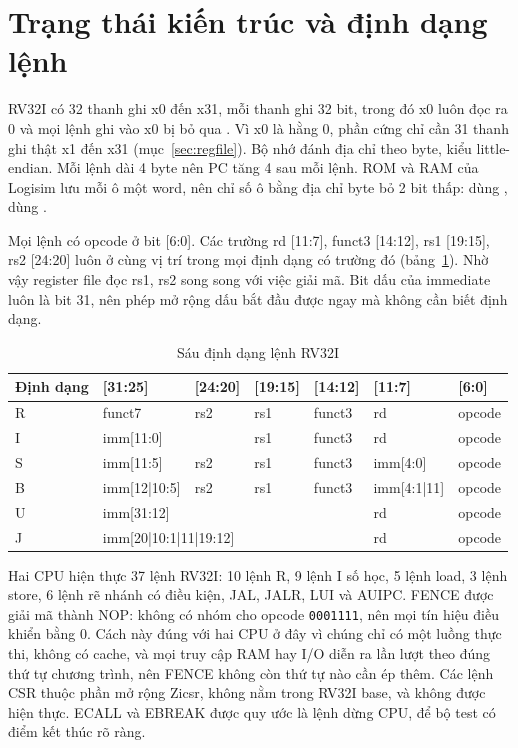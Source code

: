 \documentclass[../report.tex]{subfiles}
\begin{document}
\section{Trạng thái kiến trúc và định dạng lệnh}\label{sec:isa}

RV32I có 32 thanh ghi x0 đến x31, mỗi thanh ghi 32 bit, trong đó x0 luôn đọc ra 0 và mọi lệnh ghi vào x0 bị bỏ
qua \cite{riscv-spec}. Vì x0 là hằng 0, phần cứng chỉ cần 31 thanh ghi thật x1 đến x31
(mục~\ref{sec:regfile}). Bộ nhớ đánh địa chỉ theo byte, kiểu little-endian. Mỗi lệnh dài 4 byte nên PC tăng 4 sau
mỗi lệnh. ROM và RAM của Logisim lưu mỗi ô một word, nên chỉ số ô bằng địa chỉ byte bỏ 2 bit thấp: 
dùng ,  dùng .

Mọi lệnh có opcode ở bit [6:0]. Các trường rd [11:7], funct3 [14:12], rs1 [19:15], rs2 [24:20] luôn ở cùng vị trí
trong mọi định dạng có trường đó (bảng~\ref{tab:fmt}). Nhờ vậy register file đọc rs1, rs2 song song với việc giải
mã. Bit dấu của immediate luôn là bit 31, nên phép mở rộng dấu bắt đầu được ngay mà không cần biết định dạng.

\begin{table}[H]
\centering\small
\caption{Sáu định dạng lệnh RV32I}\label{tab:fmt}
\begin{tabular}{@{}lllllll@{}}
\toprule
Định dạng & [31:25] & [24:20] & [19:15] & [14:12] & [11:7] & [6:0] \\
\midrule
R & funct7 & rs2 & rs1 & funct3 & rd & opcode \\
I & \multicolumn{2}{l}{imm[11:0]} & rs1 & funct3 & rd & opcode \\
S & imm[11:5] & rs2 & rs1 & funct3 & imm[4:0] & opcode \\
B & imm[12|10:5] & rs2 & rs1 & funct3 & imm[4:1|11] & opcode \\
U & \multicolumn{4}{l}{imm[31:12]} & rd & opcode \\
J & \multicolumn{4}{l}{imm[20|10:1|11|19:12]} & rd & opcode \\
\bottomrule
\end{tabular}
\end{table}

Hai CPU hiện thực 37 lệnh RV32I: 10 lệnh R, 9 lệnh I số học, 5 lệnh load, 3 lệnh store, 6 lệnh rẽ nhánh có
điều kiện, JAL, JALR, LUI và AUIPC. FENCE được giải mã thành NOP:  không có nhóm cho opcode
\texttt{0001111}, nên mọi tín hiệu điều khiển bằng 0. Cách này đúng với hai CPU ở đây vì chúng chỉ có một luồng
thực thi, không có cache, và mọi truy cập RAM hay I/O diễn ra lần lượt theo đúng thứ tự chương trình, nên FENCE
không còn thứ tự nào cần ép thêm. Các lệnh CSR thuộc phần mở rộng Zicsr, không nằm trong RV32I base, và không được
hiện thực. ECALL và EBREAK được quy ước là lệnh dừng CPU, để
bộ test có điểm kết thúc rõ ràng.
\end{document}
